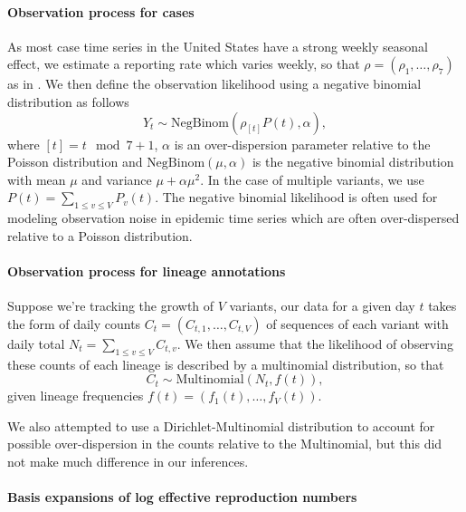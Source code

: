 \documentclass[11pt,oneside,letterpaper]{article}
\begin{document}
\paragraph{Observation process for cases}%

As most case time series in the United States have a strong weekly seasonal effect, we estimate a reporting rate which varies weekly, so that $\rho = (\rho_{1}, \ldots, \rho_{7})$ as in \cite{Abbott2020}.
We then define the observation likelihood using a negative binomial distribution as follows
\begin{equation}
  Y_{t} \sim \text{NegBinom}(\rho_{[t]} P(t),  \alpha),
\end{equation}
where $[t] = t \mod 7 + 1$, $\alpha$ is an over-dispersion parameter relative to the Poisson distribution and $\text{NegBinom}(\mu, \alpha)$ is the negative binomial distribution with mean $\mu$ and variance  $\mu + \alpha\mu^{2}$. In the case of multiple variants, we use $P(t) = \sum_{1\leq v \leq V} P_{v}(t)$.
The negative binomial likelihood is often used for modeling observation noise in epidemic time series which are often over-dispersed relative to a Poisson distribution. %

\paragraph{Observation process for lineage annotations}%

Suppose we're tracking the growth of $V$ variants, our data for a given day $t$ takes the form of daily counts $C_{t} = (C_{t,1}, \ldots, C_{t,V})$ of sequences of each variant with daily total $N_{t} = \sum_{1\leq v \leq V} C_{t, v}$.
We then assume that the likelihood of observing these counts of each lineage is described by a multinomial distribution, so that
\begin{equation}
    C_{t} \sim \text{Multinomial}(N_{t}, f(t)),
\end{equation}
given lineage frequencies $f(t) = (f_{1}(t), \ldots, f_{V}(t))$.

We also attempted to use a Dirichlet-Multinomial distribution to account for possible over-dispersion in the counts relative to the Multinomial, but this did not make much difference in our inferences.

\paragraph{Basis expansions of log effective reproduction numbers}%
\end{document}
